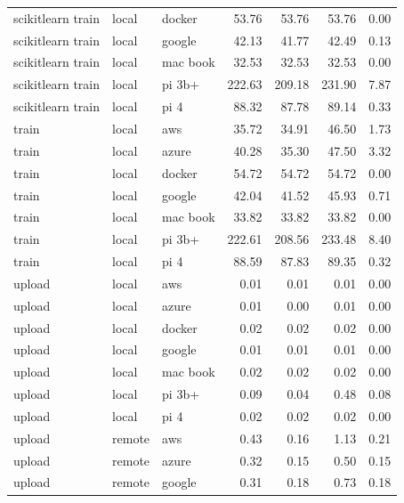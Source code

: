 \begin{table}[htb]
{\begin{tabular}{lllrrrr}
 scikitlearn train &   local &    docker &   53.76 &   53.76 &   53.76 &  0.00 \\
 scikitlearn train &   local &    google &   42.13 &   41.77 &   42.49 &  0.13 \\
 scikitlearn train &   local &  mac book &   32.53 &   32.53 &   32.53 &  0.00 \\
 scikitlearn train &   local &    pi 3b+ &  222.63 &  209.18 &  231.90 &  7.87 \\
 scikitlearn train &   local &      pi 4 &   88.32 &   87.78 &   89.14 &  0.33 \\
\midrule
             train &   local &       aws &   35.72 &   34.91 &   46.50 &  1.73 \\
             train &   local &     azure &   40.28 &   35.30 &   47.50 &  3.32 \\
             train &   local &    docker &   54.72 &   54.72 &   54.72 &  0.00 \\
             train &   local &    google &   42.04 &   41.52 &   45.93 &  0.71 \\
             train &   local &  mac book &   33.82 &   33.82 &   33.82 &  0.00 \\
             train &   local &    pi 3b+ &  222.61 &  208.56 &  233.48 &  8.40 \\
             train &   local &      pi 4 &   88.59 &   87.83 &   89.35 &  0.32 \\
\midrule
            upload &   local &       aws &    0.01 &    0.01 &    0.01 &  0.00 \\
            upload &   local &     azure &    0.01 &    0.00 &    0.01 &  0.00 \\
            upload &   local &    docker &    0.02 &    0.02 &    0.02 &  0.00 \\
            upload &   local &    google &    0.01 &    0.01 &    0.01 &  0.00 \\
            upload &   local &  mac book &    0.02 &    0.02 &    0.02 &  0.00 \\
            upload &   local &    pi 3b+ &    0.09 &    0.04 &    0.48 &  0.08 \\
            upload &   local &      pi 4 &    0.02 &    0.02 &    0.02 &  0.00 \\
\midrule
            upload &  remote &       aws &    0.43 &    0.16 &    1.13 &  0.21 \\
            upload &  remote &     azure &    0.32 &    0.15 &    0.50 &  0.15 \\
            upload &  remote &    google &    0.31 &    0.18 &    0.73 &  0.18 \\
\bottomrule
\end{tabular}
}
\bigskip


\end{table}

